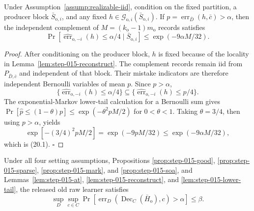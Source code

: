 \begin{lemma}\label{lem:step-015-lower-tail}
Under Assumption~\ref{assump:realizable-iid}, condition on the fixed
partition, a producer block \(\bar S_{\mathrm o,i}\), and any fixed
\(h\in\mathcal G_{\mathrm o,i}(\bar S_{\mathrm o,i})\). If
\(p=\operatorname{err}_{\bar D}(h,\bar c)>\alpha\), then the independent
complement of \(M=(k_{\mathrm o}-1)m_{\mathrm o}\) records satisfies
\[
\Pr[
\widehat{\operatorname{err}}_{\mathrm o,-i}(h)\le\alpha/4
\mid\bar S_{\mathrm o,i}]
\le\exp(-9\alpha M/32).
\tag{20.1}
\]


\end{lemma}

\begin{proof}
After conditioning on the producer block, \(h\) is fixed because of the
locality in Lemma~\ref{lem:step-015-reconstruct}. The complement records
remain iid from \(P_{\bar D,\bar c}\) and independent of that block.
Their mistake indicators are therefore independent Bernoulli variables of
mean \(p\). Since \(p>\alpha\),
\[
\{\widehat{\operatorname{err}}_{\mathrm o,-i}(h)\le\alpha/4\}
\subseteq
\{\widehat{\operatorname{err}}_{\mathrm o,-i}(h)\le p/4\}.
\]
The exponential-Markov lower-tail calculation for a Bernoulli sum gives
\(\Pr[\widehat p\le(1-\theta)p]\le
\exp(-\theta^2pM/2)\) for \(0<\theta<1\). Taking
\(\theta=3/4\), then using \(p>\alpha\), yields
\[
\exp[-(3/4)^2pM/2]
=\exp(-9pM/32)
\le\exp(-9\alpha M/32),
\]
which is (20.1). \(\square\)


\end{proof}

\begin{proposition}\label{prop:step-015-pac}
Under all four setting assumptions, Propositions
\ref{prop:step-015-good}, \ref{prop:step-015-sparse},
\ref{prop:step-015-mark}, and \ref{prop:step-015-soa}, and
Lemmas~\ref{lem:step-015-at}, \ref{lem:step-015-reconstruct}, and
\ref{lem:step-015-lower-tail}, the released old raw learner satisfies
\[
\sup_D\sup_{c\in C}
\Pr[
\operatorname{err}_D(\operatorname{Dec}_C(\bar H_{\mathrm o}),c)
>\alpha]
\le\beta.
\tag{21.1}
\]


\end{proposition}

